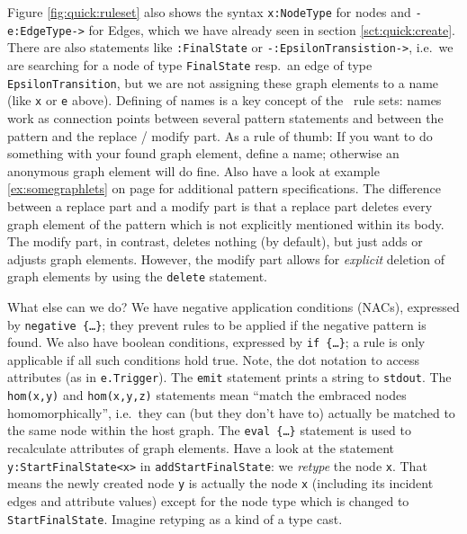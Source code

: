 Figure \ref{fig:quick:ruleset} also shows the syntax \texttt{x:NodeType} for nodes and \texttt{-e:EdgeType->} for Edges, which we have already seen in section \ref{sct:quick:create}.
There are also statements like \texttt{:FinalState} or \texttt{-:EpsilonTransistion->}, i.e.\ we are searching for a node of type \texttt{FinalState} resp.\ an edge of type \texttt{EpsilonTransition}, but we are not assigning these graph elements to a name (like \texttt{x} or \texttt{e} above).
Defining of names is a key concept of the \GrG\ rule sets: names work as connection points between several pattern statements and between the pattern and the replace / modify part.
As a rule of thumb: If you want to do something with your found graph element, define a name; otherwise an anonymous graph element will do fine.
Also have a look at example \ref{ex:somegraphlets} on page \pageref{ex:somegraphlets} for additional pattern specifications.
The difference between a replace part and a modify part is that a replace part deletes every graph element of the pattern which is not explicitly mentioned within its body.
The modify part, in contrast, deletes nothing (by default), but just adds or adjusts graph elements.
However, the modify part allows for \emph{explicit} deletion of graph elements by using the \texttt{delete} statement.

What else can we do? 
We have negative application conditions (NACs), expressed by \texttt{negative \{\dots\}}; they prevent rules to be applied if the negative pattern is found.
We also have boolean conditions, expressed by \texttt{if \{\dots\}}; a rule is only applicable if all such conditions hold true.
Note, the dot notation to access attributes (as in \texttt{e.Trigger}).
The \texttt{emit} statement prints a string to \texttt{stdout}.
The \texttt{hom(x,y)} and \texttt{hom(x,y,z)} statements mean ``match the embraced nodes homomorphically'', i.e.\ they can (but they don't have to) actually be matched to the same node within the host graph.
The \texttt{eval \{\dots\}} statement is used to recalculate attributes of graph elements.
Have a look at the statement \texttt{y:StartFinalState<x>} in \texttt{addStartFinalState}: we \emph{retype} the node \texttt{x}.
That means the newly created node \texttt{y} is actually the node \texttt{x} (including its incident edges and attribute values) except for the node type which is changed to \texttt{StartFinalState}.
Imagine retyping as a kind of a type cast.

